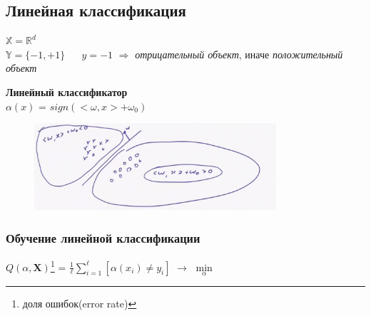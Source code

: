     \subsection{Линейная классификация }
        \begin{center}
            $\mathbb{X} = \mathbb{R}^d$\\
            $\mathbb{Y} = \{ -1, +1 \}$     \quad $\quad$ $y = -1$ $\Longrightarrow$ \textit{отрицательный объект}, иначе \textit{положительный объект}
        \end{center}

        \begin{center}
        \textbf{Линейный классификатор}\\
            \large{$\alpha(x)$ = $sign(<\omega, x> + \omega_0)$}
        \end{center}

        \begin{figure}[H]
            \centering
            \includegraphics[width=0.8\textwidth]{images/4lecture/LinearClassification.png}
        \end{figure}

        \subsubsection{Обучение линейной классификации}
            \begin{center}
                \large{$Q(\alpha, \mathbf{X})$\footnote{доля ошибок(error rate)} = $\frac{1}{\ell} \sum\limits_{i = 1}^\ell [\alpha(x_i) \neq y_i]$ $\longrightarrow$ $\min\limits_\alpha$}
            \end{center}

            \begin{center}
            \end{center}


